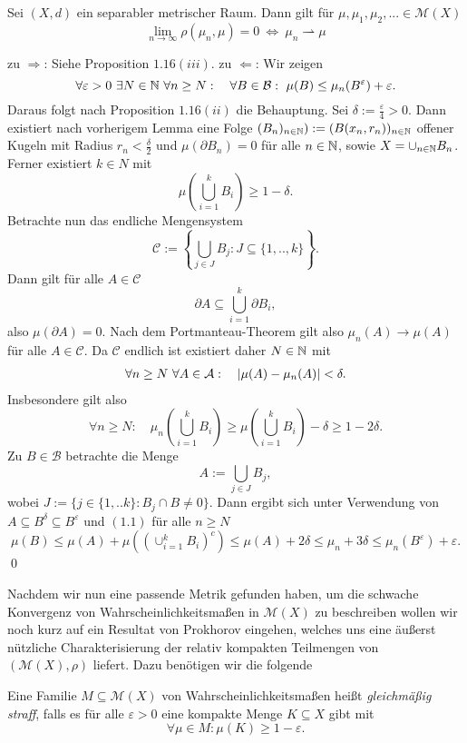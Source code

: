 \begin{theorem}
    Sei $(X,d)$ ein separabler metrischer Raum. Dann gilt für $\mu, \mu_1, \mu_2, ... \in \mathcal{M}(X)$
    $$
        \lim_{n \to \infty} \rho(\mu_n, \mu) = 0 \ \iff \ \mu_n \rightharpoonup \mu 
    $$
\end{theorem}

\begin{proof*}
    zu $\Rightarrow$: Siehe Proposition $1.16(iii)$.
    \newline 
    zu $\Leftarrow$:  Wir zeigen
    $$
        \forall \varepsilon > 0 \ \exists N \in \N \ \forall n \geq N: \quad \forall B \in \mathcal{B}: \  \mu(B) \leq \mu_n(B^{\varepsilon}) + \varepsilon. 
    $$
    Daraus folgt nach Proposition $1.16(ii)$ die Behauptung. Sei $\delta := \frac{\varepsilon}{4} > 0$. 
    Dann existiert nach vorherigem Lemma eine Folge $(B_n)_{n \in \mathbb{N}}) := (B(x_n, r_n))_{n \in \mathbb{N}}$ offener Kugeln mit Radius $r_n < \frac{\delta}{2}$  
    und $\mu(\partial B_n) = 0$ für alle $n \in \mathbb{N}$, sowie $X = \cup_{n \in  \mathbb{N}}B_n$. Ferner existiert $k \in N$ mit
    $$
        \mu\left(\bigcup_{i=1}^k B_i\right) \geq 1 - \delta. 
    $$
    Betrachte nun das endliche Mengensystem 
    $$
        \mathcal{C} := \left\{ \bigcup_{j \in J}B_j : J \subseteq \{1,..,k\}\right\}. 
    $$
    Dann gilt für alle $A \in \mathcal{C}$
    $$
        \partial A \subseteq \bigcup_{i=1}^k \partial B_i,
    $$
    also $\mu(\partial A) = 0$. Nach dem Portmanteau-Theorem gilt also $\mu_n(A) \to \mu(A)$ für alle $A \in \mathcal{C}$. Da $\mathcal{C}$ endlich ist existiert daher $N \in \mathbb{N}$ mit
    \begin{align}
        \forall n \geq N \ \forall A \in \mathcal{A}: \quad \left| \mu(A) - \mu_n(A) \right| < \delta. 
    \end{align}
    Insbesondere gilt also
    $$
        \forall n \geq N: \quad \mu_n\left(\bigcup_{i=1}^k B_i\right) \geq \mu\left(\bigcup_{i=1}^k B_i\right) - \delta \geq 1 - 2\delta. 
    $$
    Zu $B \in \mathcal{B}$ betrachte die Menge 
    $$
        A := \bigcup_{j \in J} B_j,
    $$
    wobei $J := \{j \in \{1,..k\}: B_j \cap B \neq 0 \}$. Dann ergibt sich unter Verwendung von $A \subseteq B^{\delta} \subseteq B^{\varepsilon}$ und $(1.1)$ für alle $n \geq N$ 
    $$
        \mu(B) \leq \mu(A) + \mu\left((\cup_{i=1}^k B_i)^c\right) \leq \mu(A) + 2\delta \leq \mu_n + 3\delta \leq \mu_n(B^{\varepsilon}) + \varepsilon. 
    $$
    \qed
    
\end{proof*}
Nachdem wir nun eine passende Metrik gefunden haben, um die schwache Konvergenz von Wahrscheinlichkeitsmaßen in $\mathcal{M}(X)$ zu beschreiben wollen wir noch kurz auf ein Resultat von Prokhorov eingehen, 
welches uns eine äußerst nützliche Charakterisierung der relativ kompakten Teilmengen von $(\mathcal{M}(X), \rho)$ liefert. 
Dazu benötigen wir die folgende 
\begin{mydef}
    Eine Familie $M \subseteq \mathcal{M}(X)$ von Wahrscheinlichkeitsmaßen heißt \textit{gleichmäßig straff}, 
    falls es für alle $\varepsilon > 0$ eine kompakte Menge $K \subseteq X$ gibt mit 
    $$
        \forall \mu \in M: \mu(K) \geq 1-\varepsilon. 
    $$
\end{mydef}

